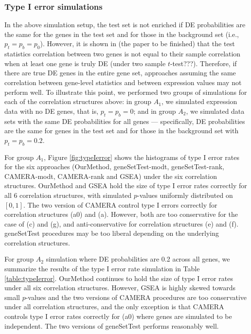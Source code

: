 \documentclass[11pt, a4paper]{article}
\begin{document}
		
		\subsubsection*{Type I error simulations}
		  
		   In the above simulation setup, the test set is not enriched if DE probabilities are the same for the genes in the test set and for those in the background set (i.e., $p_t = p_b = p_0$). However, it is shown in (the paper to be finished) that the test statistics correlation between two genes is not equal to their sample correlation when at least one gene is truly DE (under two sample $t$-test???). Therefore, if there are true DE genes in the entire gene set, approaches assuming the same correlation between gene-level statistics and between expression values may not perform well. To illustrate this point, we performed two groups of simulations for each of the correlation structures above: in group $A_1$, we simulated expression data with no DE genes, that is, $p_t = p_b = 0$; and in group $A_2$, we simulated data sets with the same DE probabilities for all genes --- specifically, DE probabilities are the same for genes in the test set and for those in the background set with $p_t= p_b = 0.2$. 
		 
		  For group $A_1$, Figure \ref{fig:typeIerror} shows the histograms of type I error rates for the six approaches (OurMethod, geneSetTest-modt, geneSetTest-rank, CAMERA-modt, CAMERA-rank and GSEA) under the six correlation structures. OurMethod and GSEA hold the size of type I error rates correctly for all 6 correlation structures, with simulated $p$-values uniformly distributed on $[0, 1]$. The two version of CAMERA control type I errors correctly for correlation structures (a0) and (a). However, both are too conservative for the case of (c) and (g), and anti-conservative for correlation structures (e) and (f). geneSetTest procedures may be too liberal depending on the underlying correlation structures. 
		  
		 For group $A_2$ simulation where DE probabilities are 0.2 across all genes, we summarize the results of the type I error rate simulation in Table \ref{table:typeIerror}. OurMethod continues to hold the size of type I error rates under all six correlation structures. However, GSEA is highly skewed towards small $p$-values and the two versions of CAMERA procedures are too conservative under all correlation structures, and the only exception is that CAMERA controls type I error rates correctly for (a0) where genes are simulated to be independent. The two versions of geneSetTest performs reasonably well.
		 
\end{document}
